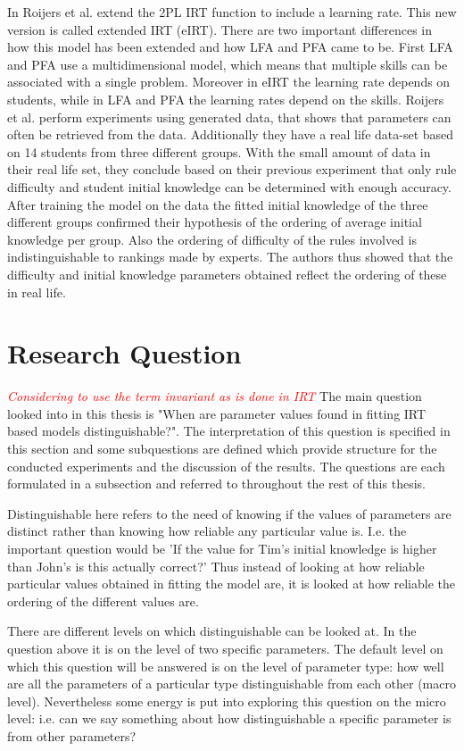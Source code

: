\documentclass{scrartcl}
\newcommand\todo[1]{\textit{\textcolor{red}{#1}}}
\begin{document}
In \cite{eirt} Roijers et al. extend the 2PL IRT function to include a learning rate. This new version is called extended IRT (eIRT). There are two important differences in how this model has been extended and how LFA and PFA came to be. First LFA and PFA use a multidimensional model, which means that multiple skills can be associated with a single problem. Moreover in eIRT the learning rate depends on students, while in LFA and PFA the learning rates depend on the skills. Roijers et al. perform experiments using generated data, that shows that parameters can often be retrieved from the data. Additionally they have a real life data-set based on 14 students from three different groups. With the small amount of data in their real life set, they conclude based on their previous experiment that only rule difficulty and student initial knowledge can be determined with enough accuracy. After training the model on the data the fitted initial knowledge of the three different groups confirmed their hypothesis of the ordering of average initial knowledge per group. Also the ordering of difficulty of the rules involved is indistinguishable to rankings made by experts. The authors thus showed that the difficulty and initial knowledge parameters obtained reflect the ordering of these in real life.


\section{Research Question}
\label{sec:RQ}
\todo{Considering to use the term invariant as is done in IRT}
The main question looked into in this thesis is "When are parameter values found in fitting IRT based models distinguishable?". The interpretation of this question is specified in this section and some subquestions are defined which provide structure for the conducted experiments and the discussion of the results. The questions are each formulated in a subsection and referred to throughout the rest of this thesis.

Distinguishable here refers to the need of knowing if the values of parameters are distinct rather than knowing how reliable any particular value is. I.e. the important question would be 'If the value for Tim's initial knowledge is higher than John's is this actually correct?' Thus instead of looking at how reliable particular values obtained in fitting the model are, it is looked at how reliable the ordering of the different values are.

There are different levels on which distinguishable can be looked at. In the question above it is on the level of two specific parameters. The default level on which this question will be answered is on the level of parameter type: how well are all the parameters of a particular type distinguishable from each other (macro level). Nevertheless some energy is put into exploring this question on the micro level: i.e. can we say something about how distinguishable a specific parameter is from other parameters?
\end{document}
